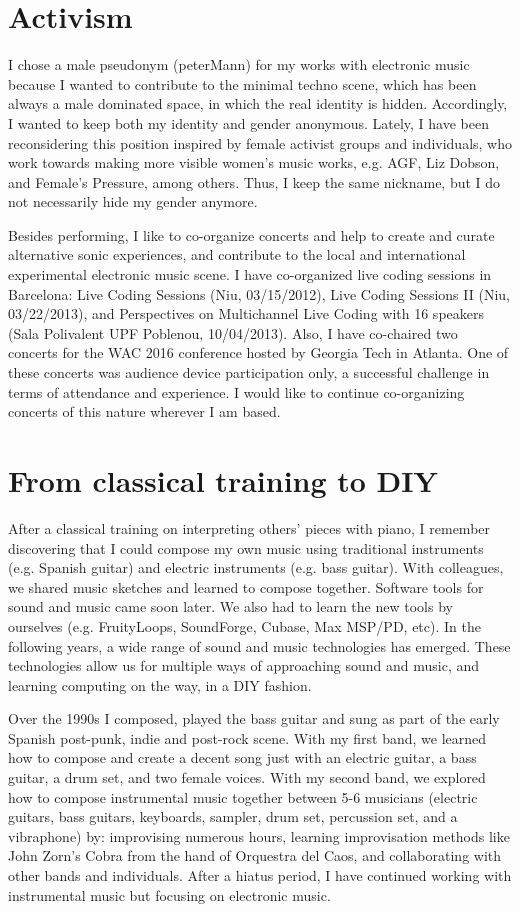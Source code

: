 \documentclass[10pt, a4paper]{article}
\begin{document}
\section*{Activism}

I chose a male pseudonym (peterMann) for my works with electronic music because I wanted to contribute to the minimal techno scene, which has been always a male dominated space, in which the real identity is hidden. Accordingly, I wanted to keep both my identity and gender anonymous. Lately, I have been reconsidering this position inspired by female activist groups and individuals, who work towards making more visible women's music works, e.g. AGF, Liz Dobson, and Female's Pressure, among others. Thus, I keep the same nickname, but I do not necessarily hide my gender anymore.

Besides performing, I like to co-organize concerts and help to create and curate alternative sonic experiences, and contribute to the local and international experimental electronic music scene. I have co-organized live coding sessions in Barcelona: Live Coding Sessions (Niu, 03/15/2012), Live Coding Sessions II (Niu, 03/22/2013), and Perspectives on Multichannel Live Coding with 16 speakers (Sala Polivalent UPF Poblenou, 10/04/2013). Also, I have co-chaired two concerts for the WAC 2016 conference hosted by Georgia Tech in Atlanta. One of these concerts was audience device participation only, a successful challenge in terms of attendance and experience. I would like to continue co-organizing concerts of this nature wherever I am based.

\section*{From classical training to DIY}

After a classical training on interpreting others' pieces with piano, I remember discovering that I could compose my own music using traditional instruments (e.g. Spanish guitar) and electric instruments (e.g. bass guitar). With colleagues, we shared music sketches and learned to compose together. Software tools for sound and music came soon later. We also had to learn the new tools by ourselves (e.g. FruityLoops, SoundForge, Cubase, Max MSP/PD, etc). In the following years, a wide range of sound and music technologies has emerged. These technologies allow us for multiple ways of approaching sound and music, and learning computing on the way, in a DIY fashion.   

Over the 1990s I composed, played the bass guitar and sung as part of the early Spanish post-punk, indie and post-rock scene. With my first band, we learned how to compose and create a decent song just with an electric guitar, a bass guitar, a drum set, and two female voices. With my second band, we explored how to compose instrumental music together between 5-6 musicians (electric guitars, bass guitars, keyboards, sampler, drum set, percussion set, and a vibraphone) by: improvising numerous hours, learning improvisation methods like John Zorn's Cobra from the hand of Orquestra del Caos, and collaborating with other bands and individuals. After a hiatus period, I have continued working with instrumental music but focusing on electronic music. 
\end{document}
